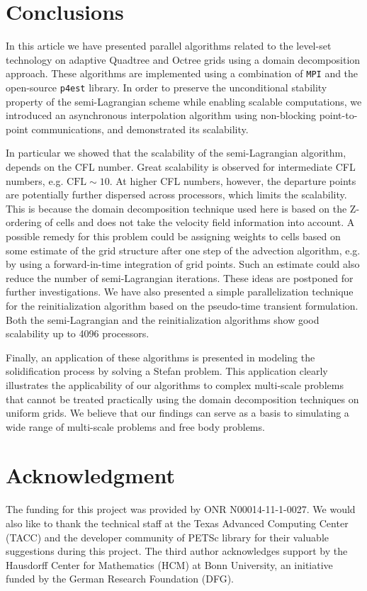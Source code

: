 \section{Conclusions}
In this article we have presented parallel algorithms related to the level-set technology on adaptive Quadtree and Octree grids using a domain decomposition approach. These algorithms are implemented using a combination of \texttt{MPI} and the open-source \texttt{p4est} library. In order to preserve the unconditional stability property of the semi-Lagrangian scheme while enabling scalable computations, we introduced an asynchronous interpolation algorithm using non-blocking point-to-point communications, and demonstrated its scalability. 

In particular we showed that the scalability of the semi-Lagrangian algorithm, depends on the CFL number. Great scalability is observed for intermediate CFL numbers, e.g. $\text{CFL}\sim10$. At higher CFL numbers, however, the departure points are potentially further dispersed across processors, which limits the scalability. This is because the domain decomposition technique used here is based on the Z-ordering of cells and does not take the velocity field information into account. A possible remedy for this problem could be assigning weights to cells based on some estimate of the grid structure after one step of the advection algorithm, e.g. by using a forward-in-time integration of grid points. Such an estimate could also reduce the number of semi-Lagrangian iterations. These ideas are postponed for further investigations. We have also presented a simple parallelization technique for the reinitialization algorithm based on the pseudo-time transient formulation. Both the semi-Lagrangian and the reinitialization algorithms show good scalability up to 4096 processors. 

Finally, an application of these algorithms is presented in modeling the solidification process by solving a Stefan problem. This application clearly illustrates the applicability of our algorithms to complex multi-scale problems that cannot be treated practically using the domain decomposition techniques on uniform grids. We believe that our findings can serve as a basis to simulating a wide range of multi-scale problems and free body problems.

\section*{Acknowledgment} 
The funding for this project was provided by ONR N00014-11-1-0027.
We would also like to thank the technical staff at the Texas Advanced Computing
Center (TACC) and the developer community of PETSc library for their valuable
suggestions during this project.
The third author acknowledges support by the Hausdorff Center for Mathematics
(HCM) at Bonn University,
an initiative funded by the German Research Foundation (DFG).
